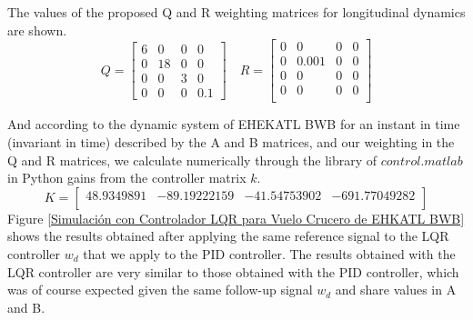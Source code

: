 The values of the proposed Q and R weighting matrices for longitudinal dynamics are shown. 
\begin{equation}
Q
=
\begin{bmatrix}
6 & 0 & 0 & 0 \\
0 & 18 & 0 & 0 \\
0 & 0 & 3 & 0 \\
0 & 0 & 0 & 0.1
\end{bmatrix} 
\quad
    R
    =
    \begin{bmatrix}
    0 & 0 & 0 & 0 \\
    0 & 0.001 & 0 & 0  \\
    0 & 0 & 0 & 0 \\
    0 & 0 & 0 & 0 \\
    \end{bmatrix}
\end{equation}

And according to the dynamic system of EHEKATL BWB for an instant in time (invariant in time) described by the A and B matrices, and our weighting in the Q and R matrices, we calculate numerically through the library of $control.matlab$ in Python gains from the controller matrix $k$.
\begin{equation}
    K
    =
    \begin{bmatrix}
    48.9349891 & -89.19222159 & -41.54753902 & -691.77049282 \\
    \end{bmatrix}
\end{equation}
Figure \ref{Simulación con Controlador LQR para Vuelo Crucero de EHKATL BWB} shows the results obtained after applying the same reference signal to the LQR controller $w_d$ that we apply to the PID controller. 
%
The results obtained with the LQR controller are very similar to those obtained with the PID controller, which was of course expected given the same follow-up signal $w_d$ and share values in A and B. 

\medskip

